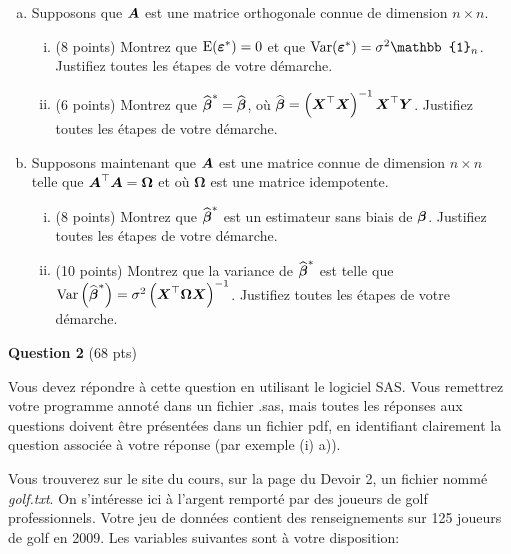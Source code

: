 \documentclass[letter, 11pt]{article}
\newcommand{\bm}{\boldmath}
\newcommand{\um}{\unboldmath}
\newcommand{\bobeta}{\mbox{\bm$\beta$}}
\newcommand{\boeps}{\mbox{\bm$\varepsilon$\um}}
\newcommand{\bo}[1]{\mbox{\bm$#1$\um}}
\begin{document}
\begin{enumerate}[(a)]
	\item Supposons que $\bo{A}$ est une matrice orthogonale connue de dimension $n\times n$.
	\begin{enumerate}[(i)]
		\item (8 points) Montrez que $\mathrm{E}(\boeps^*) = 0$ et que $\mathrm{Var}(\boeps^*) = \sigma^2 \mathbb{1}_n$. Justifiez toutes les étapes de votre démarche.
		\item (6 points) Montrez que $\widehat{\bobeta}^* = \widehat{\bobeta}$, où $\widehat{\bobeta} = \left(\bo{X}^{\top}\bo{X}\right)^{-1} \bo{X}^{\top} \bo{Y}$. Justifiez toutes les étapes de votre démarche.
	\end{enumerate}
	\item Supposons maintenant que $\bo{A}$ est une matrice connue de dimension $n\times n$ telle que $\bo{A}^\top\bo{A} = {\boldsymbol \Omega}$ et où ${\boldsymbol \Omega}$ est une matrice idempotente.
		\begin{enumerate}[(i)]
		\item (8 points) Montrez que $\widehat{\bobeta}^*$ est un estimateur sans biais de $\bobeta$. Justifiez toutes les étapes de votre démarche.
		\item (10 points)  Montrez que la variance de $\widehat{\bobeta}^*$ est telle que $\mathrm{Var}\left(\widehat{\bobeta}^*\right) = \sigma^2 \left( \bo{X}^\top {\boldsymbol \Omega} \bo{X} \right)^{-1}$. Justifiez toutes les étapes de votre démarche.
		\end{enumerate}
\end{enumerate}


\vspace{0.1 in}
\textbf{Question 2} (68 pts)
\vspace{0.1in}

Vous devez répondre à cette question en utilisant le logiciel SAS. Vous remettrez votre programme annoté dans un fichier .sas, mais toutes les réponses aux questions doivent être présentées dans un fichier pdf, en identifiant clairement la question associée à votre réponse (par exemple (i)
a)).

Vous trouverez sur le site du cours, sur la page du Devoir 2, un fichier nommé {\it golf.txt}.
On s'intéresse ici à l'argent remporté par des joueurs de golf professionnels. Votre jeu de données contient des renseignements sur 125 joueurs de golf en 2009. Les variables suivantes sont à votre disposition: 
\end{document}
